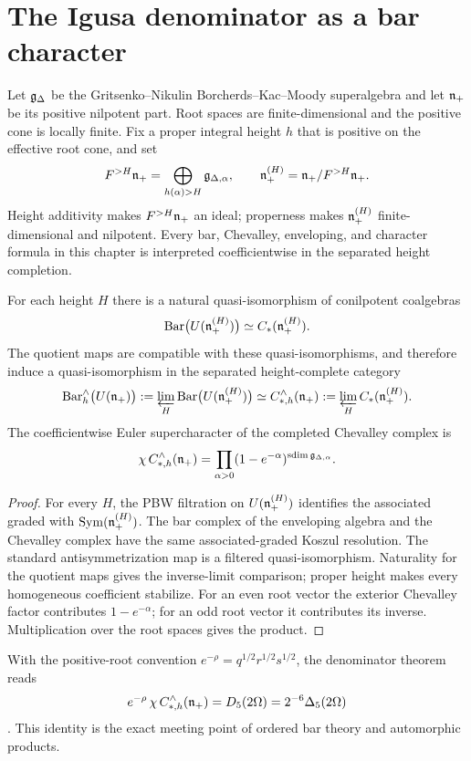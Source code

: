 \chapter{The Igusa denominator as a bar character}
Let $\mathfrak g_\Delta$ be the Gritsenko--Nikulin Borcherds--Kac--Moody superalgebra and let $\mathfrak n_+$ be its positive nilpotent part. Root spaces are finite-dimensional and the positive cone is locally finite. Fix a proper integral height $h$ that is positive on the effective root cone, and set
\[
 F^{>H}\mathfrak n_+=\bigoplus_{h(\alpha)>H}\mathfrak g_{\Delta,\alpha},
 \qquad
 \mathfrak n_+^{(H)}=\mathfrak n_+/F^{>H}\mathfrak n_+.
\]
Height additivity makes $F^{>H}\mathfrak n_+$ an ideal; properness makes $\mathfrak n_+^{(H)}$ finite-dimensional and nilpotent. Every bar, Chevalley, enveloping, and character formula in this chapter is interpreted coefficientwise in the separated height completion.

\begin{theorem}
For each height $H$ there is a natural quasi-isomorphism of conilpotent coalgebras
\[
 \operatorname{Bar}\bigl(U(\mathfrak n_+^{(H)})\bigr)\simeq C_*(\mathfrak n_+^{(H)}).
\]
The quotient maps are compatible with these quasi-isomorphisms, and therefore induce a quasi-isomorphism in the separated height-complete category
\[
 \operatorname{Bar}_h^\wedge\bigl(U(\mathfrak n_+)\bigr):=\varprojlim_H\operatorname{Bar}\bigl(U(\mathfrak n_+^{(H)})\bigr)
 \simeq
 C_{*,h}^\wedge(\mathfrak n_+):=\varprojlim_H C_*(\mathfrak n_+^{(H)}).
\]
The coefficientwise Euler supercharacter of the completed Chevalley complex is
\[
 \chi\,C_{*,h}^\wedge(\mathfrak n_+)
 =\prod_{\alpha>0}(1-e^{-\alpha})^{\operatorname{sdim}\mathfrak g_{\Delta,\alpha}}.
\]
\end{theorem}
\begin{proof}
For every $H$, the PBW filtration on $U(\mathfrak n_+^{(H)})$ identifies the associated graded with $\operatorname{Sym}(\mathfrak n_+^{(H)})$. The bar complex of the enveloping algebra and the Chevalley complex have the same associated-graded Koszul resolution. The standard antisymmetrization map is a filtered quasi-isomorphism. Naturality for the quotient maps gives the inverse-limit comparison; proper height makes every homogeneous coefficient stabilize. For an even root vector the exterior Chevalley factor contributes $1-e^{-\alpha}$; for an odd root vector it contributes its inverse. Multiplication over the root spaces gives the product.
\end{proof}

With the positive-root convention $e^{-\rho}=q^{1/2}r^{1/2}s^{1/2}$, the denominator theorem reads
\[
 e^{-\rho}\,\chi\,C_{*,h}^\wedge(\mathfrak n_+)=D_5(2\Omega)=2^{-6}\Delta_5(2\Omega)
\]
\cite{GN97,GN98b}. This identity is the exact meeting point of ordered bar theory and automorphic products.

